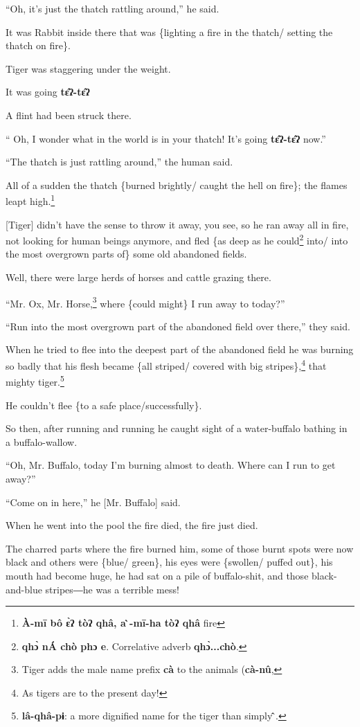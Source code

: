 {``Oh, it's just the thatch rattling around,'' he said.

It was Rabbit inside there that was \{lighting a fire in the thatch/ setting the
thatch on fire\}.

Tiger was staggering under the weight.

It was going \textbf{tɛ̂ʔ-tɛ̂ʔ}

A flint had been struck there.

`` Oh, I wonder what in the world is in your thatch! It's going \textbf{tɛ̂ʔ-tɛ̂ʔ}
now.''

``The thatch is just rattling around,'' the human said.

All of a sudden the thatch \{burned brightly/ caught the hell on fire\}; the flames
leapt high.\footnote{\textbf{ À-mī  bô ɛ̀ʔ  tòʔ   qhâ, a 	̀-mī-ha tòʔ qhâ} fire}

[Tiger] didn't have the sense to throw it away, you see, so he ran away all in
fire, not looking for human beings anymore, and fled \{as deep as he could\footnote{\textbf{ qhɔ̀ nÁ chò phɔ e}. Correlative adverb \textbf{qhɔ̀...chò}.}
into/ into the most overgrown parts of\} some old abandoned fields.

Well, there were large herds of horses and cattle grazing there.

``Mr. Ox, Mr. Horse,\footnote{Tiger adds the male name prefix \textbf{cà} to the animals (\textbf{cà-nû},} where \{could might\} I run away to today?''

``Run into the most overgrown part of the abandoned field over there,'' they said.

When he tried to flee into the deepest part of the abandoned field he was burning
so badly that his flesh became \{all striped/ covered with big stripes\},\footnote{As tigers are to the present day!} that
mighty tiger.\footnote{\textbf{lâ-qhâ-pɨ}: a more dignified name for the tiger than simply\textbf{ ̂}.}

He couldn't flee \{to a safe place/successfully\}.

So then, after running and running he caught sight of a water-buffalo bathing in
a buffalo-wallow.

``Oh, Mr. Buffalo, today I'm burning almost to death. Where can I run to get away?''

``Come on in here,'' he [Mr. Buffalo] said.

When he went into the pool the fire died, the fire just died.

The charred parts where the fire burned him, some of those burnt spots were now
black and others were \{blue/ green\}, his eyes were \{swollen/ puffed out\}, his
mouth had become huge, he had sat on a pile of buffalo-shit, and those black-and-blue
stripes―he was a terrible mess!

}
